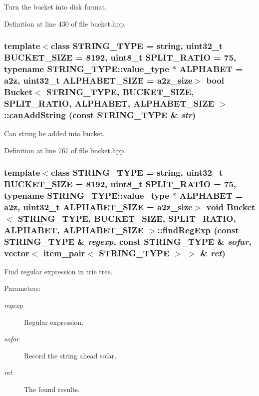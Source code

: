 Turn the bucket into disk format. 

Definition at line 430 of file bucket.hpp.\hypertarget{classBucket_e7e4d1a75e5d64a82f82fd0299e263a1}{
\subsubsection[{canAddString}]{\setlength{\rightskip}{0pt plus 5cm}template$<$class STRING\_\-TYPE  = string, uint32\_\-t BUCKET\_\-SIZE = 8192, uint8\_\-t SPLIT\_\-RATIO = 75, typename STRING\_\-TYPE::value\_\-type $\ast$ ALPHABET = a2z, uint32\_\-t ALPHABET\_\-SIZE = a2z\_\-size$>$ bool {\bf Bucket}$<$ STRING\_\-TYPE, BUCKET\_\-SIZE, SPLIT\_\-RATIO, ALPHABET, ALPHABET\_\-SIZE $>$::canAddString (const STRING\_\-TYPE \& {\em str})}}
\label{classBucket_e7e4d1a75e5d64a82f82fd0299e263a1}


Can string be added into bucket. 

Definition at line 767 of file bucket.hpp.\hypertarget{classBucket_5765eb43f348b3868173dd4360e031bc}{
\subsubsection[{findRegExp}]{\setlength{\rightskip}{0pt plus 5cm}template$<$class STRING\_\-TYPE  = string, uint32\_\-t BUCKET\_\-SIZE = 8192, uint8\_\-t SPLIT\_\-RATIO = 75, typename STRING\_\-TYPE::value\_\-type $\ast$ ALPHABET = a2z, uint32\_\-t ALPHABET\_\-SIZE = a2z\_\-size$>$ void {\bf Bucket}$<$ STRING\_\-TYPE, BUCKET\_\-SIZE, SPLIT\_\-RATIO, ALPHABET, ALPHABET\_\-SIZE $>$::findRegExp (const STRING\_\-TYPE \& {\em regexp}, \/  const STRING\_\-TYPE \& {\em sofar}, \/  vector$<$ item\_\-pair$<$ STRING\_\-TYPE $>$ $>$ \& {\em ret})}}
\label{classBucket_5765eb43f348b3868173dd4360e031bc}


Find regular expression in trie tree. \begin{Desc}
\item[Parameters:]
\begin{description}
\item[{\em regexp}]Regular expression. \item[{\em sofar}]Record the string ahead sofar. \item[{\em ret}]The found results. \end{description}
\end{Desc}



